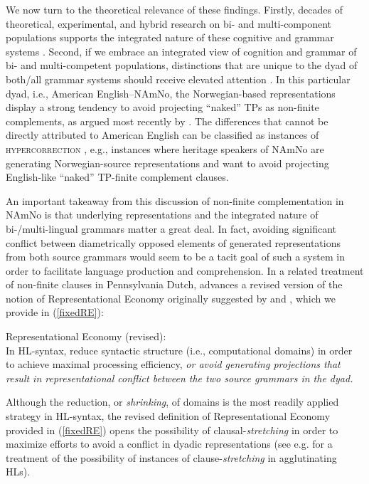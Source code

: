 \documentclass[output=paper,colorlinks,citecolor=brown]{langscibook}
\begin{document}
We now turn to the theoretical relevance of these findings. Firstly, decades of theoretical, experimental, and hybrid research on bi- and multi-component populations supports the integrated nature of these cognitive and grammar systems \citep{putnam2018,aboh2015}. Second, if we embrace an integrated view of cognition and grammar of bi- and multi-competent populations, distinctions that are unique to the dyad of both\slash all grammar systems should receive elevated attention \citep{sconput20}. In this particular dyad, i.e., American English--NAmNo, the Norwegian-based representations display a strong tendency to avoid projecting “naked” TPs as non-finite complements, as argued most recently by \citet{putsoft,putsoft23}. The differences that cannot be directly attributed to American English can be classified as instances of \textsc{hypercorrection} \citep{kupisch2014adjective,putnamhoff21}, e.g., instances where heritage speakers of NAmNo are generating Norwegian-source representations and want to avoid projecting English\hyp like “naked” TP-finite complement clauses. 

An important takeaway from this discussion of non-finite complementation in NAmNo is that underlying representations and the integrated nature of bi-/multi-lingual grammars matter a great deal. In fact, avoiding significant conflict between diametrically opposed elements of generated representations from both source grammars would seem to be a tacit goal of such a system in order to facilitate language production and comprehension. In a related treatment of non-finite clauses in Pennsylvania Dutch, \citet{putPDtoappear} advances a revised version of the notion of Representational Economy originally suggested by \citet{scontras2018} and \citet{polinsky2020}, which we provide in (\ref{fixedRE}): 

\begin{exe}

\item \label{fixedRE} Representational Economy (revised):\\
 In HL-syntax, reduce syntactic structure (i.e., computational domains) in order to achieve maximal processing efficiency, \textit{or avoid generating projections that result in representational conflict between the two source grammars in the dyad.}

\end{exe}

Although the reduction, or \textit{shrinking}, of domains is the most readily applied strategy in HL-syntax, the revised definition of Representational Economy provided in (\ref{fixedRE}) opens the possibility of clausal-\textit{stretching} in order to maximize efforts to avoid a conflict in dyadic representations (see e.g. \citealt{lohnput23} for a treatment of the possibility of instances of clause-\textit{stretching} in agglutinating HLs). 
\end{document}
